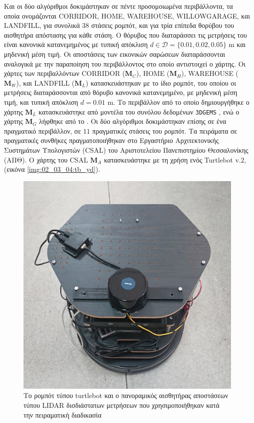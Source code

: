 Και οι δύο αλγόριθμοι δοκιμάστηκαν σε πέντε προσομοιωμένα περιβάλλοντα, τα
οποία ονομάζονται CORRIDOR, HOME, WAREHOUSE, WILLOWGARAGE, και LANDFILL, για
συνολικά $38$ στάσεις ρομπότ, και για τρία επίπεδα θορύβου του αισθητήρα
απόστασης για κάθε στάση. Ο θόρυβος που διαταράσσει τις μετρήσεις του είναι
κανονικά κατανεμημένος με τυπική απόκλιση $d \in \mathcal{D} = \{0.01, 0.02,
0.05\}$ m και μηδενική μέση τιμή. Οι αποστάσεις των εικονικών σαρώσεων
διαταράσσονται αναλογικά με την παραποίηση του περιβάλλοντος στο οποίο
αντιστοιχεί ο χάρτης.  Οι χάρτες των περιβαλλόντων CORRIDOR ($\bm{M}_C$), HOME
($\bm{M}_H$), WAREHOUSE ($\bm{M}_W$), και LANDFILL ($\bm{M}_L$) κατασκευάστηκαν
με το ίδιο ρομπότ, του οποίου οι μετρήσεις διαταράσσονται από θόρυβο κανονικά
κατανεμημένο, με μηδενική μέση τιμή, και τυπική απόκλιση $d = 0.01$ m. Το
περιβάλλον από το οποίο δημιουργήθηκε ο χάρτης $\bm{M}_L$ κατασκευάστηκε από
μοντέλα του συνόλου δεδομένων \texttt{3DGEMS} \cite{Rasouli2017}, ενώ ο χάρτης
$\bm{M}_G$ λήφθηκε από το \cite{willow_map}.  Οι δύο αλγόριθμοι δοκιμάστηκαν
επίσης σε ένα πραγματικό περιβάλλον, σε $11$ πραγματικές στάσεις του ρομπότ. Τα
πειράματα σε πραγματικές συνθήκες πραγματοποιήθηκαν στο Εργαστήριο
Αρχιτεκτονικής Συστημάτων Υπολογιστών (CSAL) του Αριστοτελείου Πανεπιστημίου
Θεσσαλονίκης (ΑΠΘ). Ο χάρτης του CSAL $\bm{M}_A$ κατασκευάστηκε με τη χρήση
ενός Turtlebot v.$2$, (εικόνα \ref{img:02_03_04:tb_yd}).

\begin{figure}\centering
  \includegraphics[scale=0.2]{./figures/parts/02/chapters/03/sections/04/tb_yd.jpg}
  \caption{\small Το ρομπότ τύπου turtlebot και ο πανοραμικός αισθητήρας
           αποστάσεων τύπου LIDAR δισδιάστατων μετρήσεων που χρησιμοποιήθηκαν
           κατά την πειραματική διαδικασία}
  \label{img:02_03_04:tb_yd}
\label{}
\end{figure}

